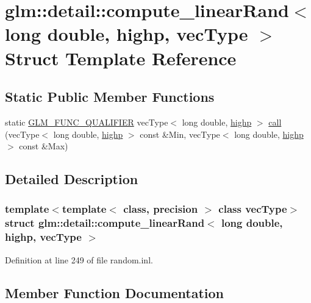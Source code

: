 \hypertarget{structglm_1_1detail_1_1compute__linear_rand_3_01long_01double_00_01highp_00_01vec_type_01_4}{}\section{glm\+::detail\+::compute\+\_\+linear\+Rand$<$ long double, highp, vec\+Type $>$ Struct Template Reference}
\label{structglm_1_1detail_1_1compute__linear_rand_3_01long_01double_00_01highp_00_01vec_type_01_4}
\subsection*{Static Public Member Functions}
\begin{DoxyCompactItemize}
\item 
static \mbox{\hyperlink{setup_8hpp_a33fdea6f91c5f834105f7415e2a64407}{G\+L\+M\+\_\+\+F\+U\+N\+C\+\_\+\+Q\+U\+A\+L\+I\+F\+I\+ER}} vec\+Type$<$ long double, \mbox{\hyperlink{namespaceglm_a0f04f086094c747d227af4425893f545ac6f7eab42eacbb10d59a58e95e362074}{highp}} $>$ \mbox{\hyperlink{structglm_1_1detail_1_1compute__linear_rand_3_01long_01double_00_01highp_00_01vec_type_01_4_ace5ddc612cfa5043fad6b875fdb86553}{call}} (vec\+Type$<$ long double, \mbox{\hyperlink{namespaceglm_a0f04f086094c747d227af4425893f545ac6f7eab42eacbb10d59a58e95e362074}{highp}} $>$ const \&Min, vec\+Type$<$ long double, \mbox{\hyperlink{namespaceglm_a0f04f086094c747d227af4425893f545ac6f7eab42eacbb10d59a58e95e362074}{highp}} $>$ const \&Max)
\end{DoxyCompactItemize}


\subsection{Detailed Description}
\subsubsection*{template$<$template$<$ class, precision $>$ class vec\+Type$>$\newline
struct glm\+::detail\+::compute\+\_\+linear\+Rand$<$ long double, highp, vec\+Type $>$}



Definition at line 249 of file random.\+inl.



\subsection{Member Function Documentation}
\mbox{\label{structglm_1_1detail_1_1compute__linear_rand_3_01long_01double_00_01highp_00_01vec_type_01_4_ace5ddc612cfa5043fad6b875fdb86553}} 
